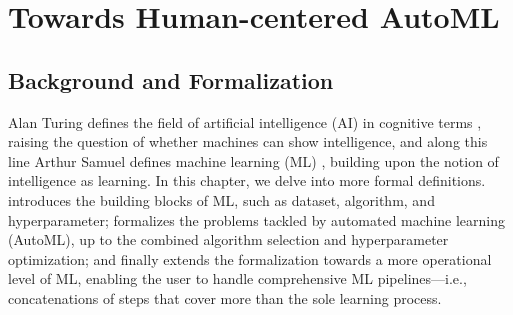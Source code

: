 \documentclass[a4paper,12pt,times,numbered,print,index]{Classes/PhDThesisPSnPDF}
\begin{document}



\part{Towards Human-centered AutoML}\label{part:automl}


\chapter{Background and Formalization}
\label{automl-chap:background}

Alan Turing defines the field of artificial intelligence (AI) in cognitive terms \cite{turing1980computing}, raising the question of whether machines can show intelligence, and along this line Arthur Samuel defines machine learning (ML) \cite{samuel2000some}, building upon the notion of intelligence as learning.
In this chapter, we delve into more formal definitions.
 introduces the building blocks of ML, such as dataset, algorithm, and hyperparameter;
 formalizes the problems tackled by automated machine learning (AutoML), up to the combined algorithm selection and hyperparameter optimization;
and finally  extends the formalization towards a more operational level of ML, enabling the user to handle comprehensive ML pipelines---i.e., concatenations of steps that cover more than the sole learning process.
\end{document}
